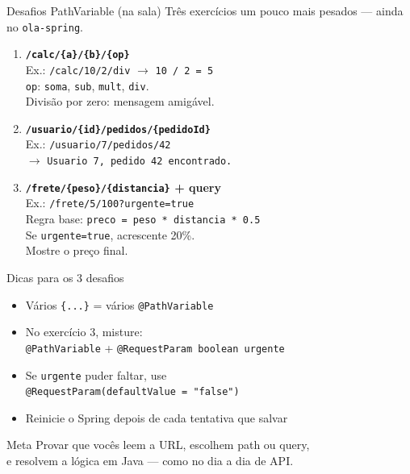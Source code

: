 \documentclass[aspectratio=169,11pt]{beamer}
\begin{document}
\begin{frame}{Desafios PathVariable (na sala)}
  Três exercícios um pouco mais pesados --- ainda no \texttt{ola-spring}.

  \vspace{0.4em}
  \begin{enumerate}
    \item \textbf{\texttt{/calc/\{a\}/\{b\}/\{op\}}}\\
          Ex.: \texttt{/calc/10/2/div} $\rightarrow$ \texttt{10 / 2 = 5}\\
          \texttt{op}: \texttt{soma}, \texttt{sub}, \texttt{mult}, \texttt{div}.\\
          Divisão por zero: mensagem amigável.
    \item \textbf{\texttt{/usuario/\{id\}/pedidos/\{pedidoId\}}}\\
          Ex.: \texttt{/usuario/7/pedidos/42}\\
          $\rightarrow$ \texttt{Usuario 7, pedido 42 encontrado.}
    \item \textbf{\texttt{/frete/\{peso\}/\{distancia\}} + query}\\
          Ex.: \texttt{/frete/5/100?urgente=true}\\
          Regra base: \texttt{preco = peso * distancia * 0.5}\\
          Se \texttt{urgente=true}, acrescente 20\%.\\
          Mostre o preço final.
  \end{enumerate}
\end{frame}

\begin{frame}{Dicas para os 3 desafios}
  \begin{itemize}
    \item Vários \texttt{\{...\}} = vários \texttt{@PathVariable}
    \item No exercício 3, misture:\\
          \texttt{@PathVariable} + \texttt{@RequestParam boolean urgente}
    \item Se \texttt{urgente} puder faltar, use\\
          \texttt{@RequestParam(defaultValue = "false")}
    \item Reinicie o Spring depois de cada tentativa que salvar
  \end{itemize}

  \vspace{0.6em}
  \begin{alertblock}{Meta}
    Provar que vocês leem a URL, escolhem path ou query,\\
    e resolvem a lógica em Java --- como no dia a dia de API.
  \end{alertblock}
\end{frame}
\end{document}
